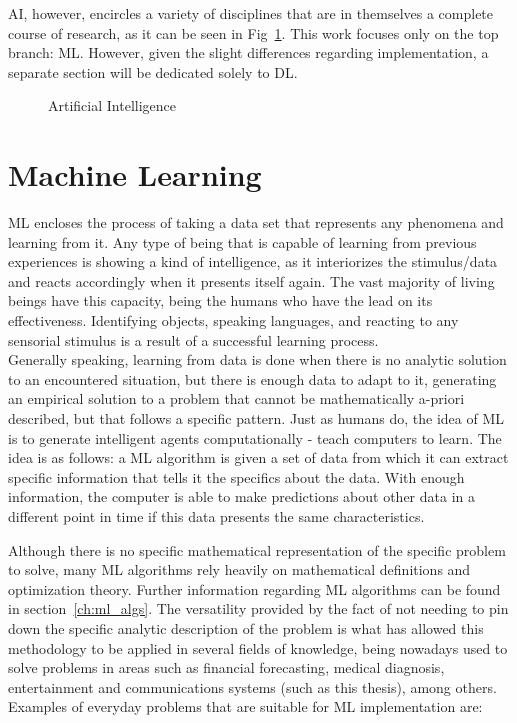 \ac{AI}, however, encircles a variety of disciplines that are in themselves a complete course of research, as it can be seen in Fig~\ref{fig:ai}. This work focuses only on the top branch: \ac{ML}. However, given the slight differences regarding implementation, a separate section will be dedicated solely to \ac{DL}.

\begin{figure}[htb]
    \centering
      
      \caption{Artificial Intelligence}
      \label{fig:ai}
\end{figure}

\section{Machine Learning}
\ac{ML} encloses the process of taking a data set that represents any phenomena and learning from it. Any type of being that is capable of learning from previous experiences is showing a kind of intelligence, as it interiorizes the stimulus/data and reacts accordingly when it presents itself again. The vast majority of living beings have this capacity, being the humans who have the lead on its effectiveness. Identifying objects, speaking languages, and reacting to any sensorial stimulus is a result of a successful learning process. \\

Generally speaking, learning from data is done when there is no analytic solution to an encountered situation, but there is enough data to adapt to it, generating an empirical solution to a problem that cannot be mathematically a-priori described, but that follows a specific pattern\cite{Yaser}. Just as humans do, the idea of \ac{ML} is to generate intelligent agents computationally - teach computers to learn. The idea is as follows: a \ac{ML} algorithm is given a set of data from which it can extract specific information that tells it the specifics about the data. With enough information, the computer is able to make predictions about other data in a different point in time if this data presents the same characteristics.

Although there is no specific mathematical representation of the specific problem to solve, many \ac{ML} algorithms rely heavily on mathematical definitions and optimization theory. Further information regarding \ac{ML} algorithms can be found in section~\ref{ch:ml_algs}. The versatility provided by the fact of not needing to pin down the specific analytic description of the problem is what has allowed this methodology to be applied in several fields of knowledge, being nowadays used to solve problems in areas such as financial forecasting\cite{Bose2001}, medical diagnosis\cite{Kononenko2001}, entertainment\cite{Bennett2007} and communications systems (such as this thesis), among others. Examples of everyday problems that are suitable for \ac{ML} implementation are:

